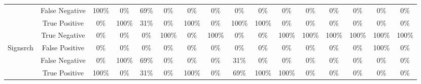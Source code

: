 \begin{table}[htb]
\begin{adjustbox}{width=\textwidth}
\begin{tabular}{cc|ccccccccc|ccccc}
\multicolumn{1}{c|}{} & \multicolumn{1}{c||}{False Negative} & \multicolumn{1}{c|}{100\%} & \multicolumn{1}{c|}{0\%} & \multicolumn{1}{c|}{69\%} & \multicolumn{1}{c|}{0\%} & \multicolumn{1}{c|}{0\%} & \multicolumn{1}{c|}{0\%} & \multicolumn{1}{c|}{0\%} & \multicolumn{1}{c|}{0\%} & \multicolumn{1}{c|}{0\%} & \multicolumn{1}{c|}{0\%} & \multicolumn{1}{c|}{0\%} & \multicolumn{1}{c|}{0\%} & \multicolumn{1}{c|}{0\%} & 0\% \\ \cline{2-16} 
\multicolumn{1}{c|}{} & \multicolumn{1}{c||}{True Positive} & \multicolumn{1}{c|}{0\%} & \multicolumn{1}{c|}{100\%} & \multicolumn{1}{c|}{31\%} & \multicolumn{1}{c|}{0\%} & \multicolumn{1}{c|}{100\%} & \multicolumn{1}{c|}{0\%} & \multicolumn{1}{c|}{100\%} & \multicolumn{1}{c|}{100\%} & \multicolumn{1}{c|}{0\%} & \multicolumn{1}{c|}{0\%} & \multicolumn{1}{c|}{0\%} & \multicolumn{1}{c|}{0\%} & \multicolumn{1}{c|}{0\%} & 0\% \\ \cline{2-16} 
\multicolumn{1}{c|}{} & \multicolumn{1}{c||}{True Negative} & \multicolumn{1}{c|}{0\%} & \multicolumn{1}{c|}{0\%} & \multicolumn{1}{c|}{0\%} & \multicolumn{1}{c|}{100\%} & \multicolumn{1}{c|}{0\%} & \multicolumn{1}{c|}{100\%} & \multicolumn{1}{c|}{0\%} & \multicolumn{1}{c|}{0\%} & \multicolumn{1}{c|}{100\%} & \multicolumn{1}{c|}{100\%} & \multicolumn{1}{c|}{100\%} & \multicolumn{1}{c|}{100\%} & \multicolumn{1}{c|}{100\%} & 100\% \\ \hline
\multicolumn{1}{c|}{\multirow{4}{*}{Signsrch}} & \multicolumn{1}{c||}{False Positive} & \multicolumn{1}{c|}{0\%} & \multicolumn{1}{c|}{0\%} & \multicolumn{1}{c|}{0\%} & \multicolumn{1}{c|}{0\%} & \multicolumn{1}{c|}{0\%} & \multicolumn{1}{c|}{0\%} & \multicolumn{1}{c|}{0\%} & \multicolumn{1}{c|}{0\%} & \multicolumn{1}{c|}{0\%} & \multicolumn{1}{c|}{0\%} & \multicolumn{1}{c|}{0\%} & \multicolumn{1}{c|}{0\%} & \multicolumn{1}{c|}{100\%} & 0\% \\ \cline{2-16} 
\multicolumn{1}{c|}{} & \multicolumn{1}{c||}{False Negative} & \multicolumn{1}{c|}{0\%} & \multicolumn{1}{c|}{100\%} & \multicolumn{1}{c|}{69\%} & \multicolumn{1}{c|}{0\%} & \multicolumn{1}{c|}{0\%} & \multicolumn{1}{c|}{0\%} & \multicolumn{1}{c|}{31\%} & \multicolumn{1}{c|}{0\%} & \multicolumn{1}{c|}{0\%} & \multicolumn{1}{c|}{0\%} & \multicolumn{1}{c|}{0\%} & \multicolumn{1}{c|}{0\%} & \multicolumn{1}{c|}{0\%} & 0\% \\ \cline{2-16} 
\multicolumn{1}{c|}{} & \multicolumn{1}{c||}{True Positive} & \multicolumn{1}{c|}{100\%} & \multicolumn{1}{c|}{0\%} & \multicolumn{1}{c|}{31\%} & \multicolumn{1}{c|}{0\%} & \multicolumn{1}{c|}{100\%} & \multicolumn{1}{c|}{0\%} & \multicolumn{1}{c|}{69\%} & \multicolumn{1}{c|}{100\%} & \multicolumn{1}{c|}{100\%} & \multicolumn{1}{c|}{0\%} & \multicolumn{1}{c|}{0\%} & \multicolumn{1}{c|}{0\%} & \multicolumn{1}{c|}{0\%} & 0\% \\ \cline{2-16} 

\end{tabular}
\end{adjustbox}
\end{table}
